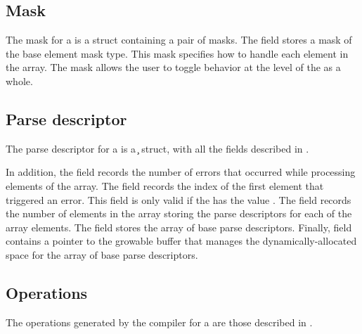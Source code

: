 \subsection{Mask}
\label{sec:arrays-masks}
The mask for a \Parray{} is a struct containing a pair of masks.  The
 field stores a mask of the base element mask type.  This
mask specifies how to handle each element in the array.  The
 mask allows the user to toggle behavior at the level
of the \Parray{} as a whole. 



\subsection{Parse descriptor}
\label{sec:arrays-parse-descriptors}
The parse descriptor for a \Parray{} is a \c{} struct, with all the
fields described in .  

In addition, the field  records the number of errors that
occurred while processing elements of the array. The field
 records the index of the first element that triggered
an error.  This field is only valid if the  has the value
.  The  field records the number of
elements in the array storing the parse descriptors for each of the
array elements.  The field  stores the array of base parse
descriptors.  Finally, field  contains a pointer to the
growable buffer that manages the dynamically-allocated space for the
array of base parse descriptors.

\subsection{Operations}
The operations generated by the \pads{} compiler for a \Parray{} are
those described in .



